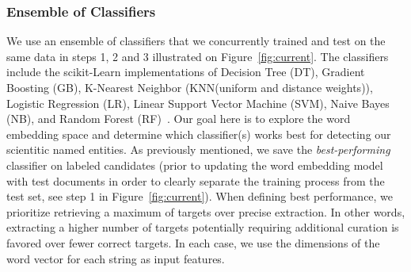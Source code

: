 \subsubsection{Ensemble of Classifiers}
We use an ensemble of classifiers that we concurrently trained and test on the same data in steps 1, 2 and 3 illustrated on Figure~\ref{fig:current}.
The classifiers include the scikit-Learn implementations of Decision Tree (DT), Gradient Boosting (GB), K-Nearest Neighbor (KNN(uniform and distance weights)), Logistic Regression (LR), Linear Support Vector Machine (SVM), Naive Bayes (NB), and Random Forest (RF)~\cite{scikit-learn}. 
Our goal here is to explore the word embedding space and determine which classifier(s) works best for detecting our scientitic named entities.
As previously mentioned, we save the \textit{best-performing} classifier on labeled candidates (prior to updating the word embedding model  with test documents in order to clearly separate the training process from the test set, see step 1 in Figure~\ref{fig:current}).
When defining best performance, we prioritize retrieving a maximum of targets over precise extraction.
In other words, extracting a higher number of targets potentially requiring additional curation is favored over fewer correct targets.
In each case, we use the dimensions of the word vector for each string as input features.




